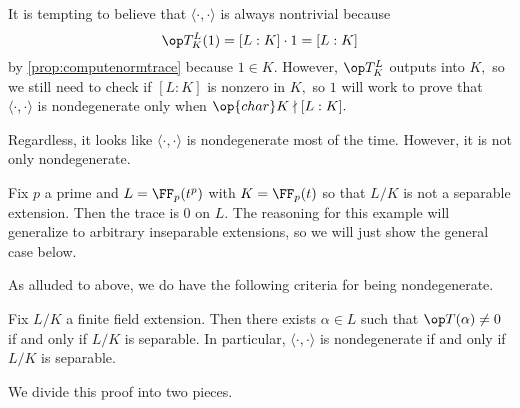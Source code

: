 It is tempting to believe that $\langle\cdot,\cdot\rangle$ is always nontrivial because
\[\op T^L_K(1)=[L:K]\cdot1=[L:K]\]
by \autoref{prop:computenormtrace} because $1\in K.$ However, $\op T^L_K$ outputs into $K,$ so we still need to check if $[L:K]$ is nonzero in $K,$ so $1$ will work to prove that $\langle\cdot,\cdot\rangle$ is nondegenerate only when $\op{char}K\nmid[L:K].$

Regardless, it looks like $\langle\cdot,\cdot\rangle$ is nondegenerate most of the time. However, it is not only nondegenerate.
\begin{ex}
	Fix $p$ a prime and $L=\FF_p(t^p)$ with $K=\FF_p(t)$ so that $L/K$ is not a separable extension. Then the trace is $0$ on $L.$ The reasoning for this example will generalize to arbitrary inseparable extensions, so we will just show the general case below.
\end{ex}
As alluded to above, we do have the following criteria for being nondegenerate.
\begin{theorem} \label{thm:nondegtrace}
	Fix $L/K$ a finite field extension. Then there exists $\alpha\in L$ such that $\op T(\alpha)\ne0$ if and only if $L/K$ is separable. In particular, $\langle\cdot,\cdot\rangle$ is nondegenerate if and only if $L/K$ is separable.
\end{theorem}
We divide this proof into two pieces.
